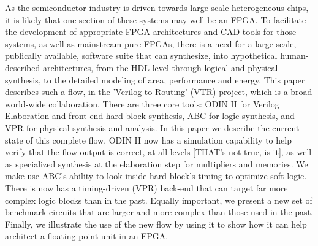 As the semiconductor industry is driven towards large scale heterogeneous chips,
it is likely that one section of these systems may well be an FPGA.  To facilitate
the development of appropriate FPGA architectures and CAD tools for those systems,
as well as mainstream pure FPGAs, there is a need for a large scale, publically available,
software suite that can synthesize, into hypothetical human-described architectures, 
from the HDL level through logical and physical synthesis, to the detailed modeling
of area, performance and energy.  This paper describes such a flow, in the 'Verilog to Routing'
(VTR) project, which is a broad world-wide collaboration.   There are three core tools: ODIN II
for Verilog Elaboration and front-end hard-block synthesis, ABC for logic synthesis, and VPR for
physical synthesis and analysis.  In this paper we describe the current state of this complete
flow. ODIN II now has a simulation capability to help verify that the flow output is correct,
at all levels [THAT's not true, is it], as well as specialized synthesis at the elaboration step
for multipliers and memories. We make use ABC's ability to look inside hard block's timing
to optimize soft logic.  There is now has a timing-driven (VPR) back-end that can target far more complex logic blocks
than in the past.  Equally important, we present a new set of benchmark circuits that are larger and
more complex than those used in the past.  Finally, we illustrate the use of the new
flow by using it to show how it can help architect a floating-point unit in an FPGA.

